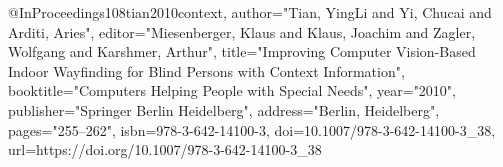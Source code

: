 @InProceedings{108tian2010context,
author="Tian, YingLi
and Yi, Chucai
and Arditi, Aries",
editor="Miesenberger, Klaus
and Klaus, Joachim
and Zagler, Wolfgang
and Karshmer, Arthur",
title="Improving Computer Vision-Based Indoor Wayfinding for Blind Persons with Context Information",
booktitle="Computers Helping People with Special Needs",
year="2010",
publisher="Springer Berlin Heidelberg",
address="Berlin, Heidelberg",
pages="255--262",
isbn={978-3-642-14100-3},
doi={10.1007/978-3-642-14100-3_38},
url={https://doi.org/10.1007/978-3-642-14100-3_38}
}